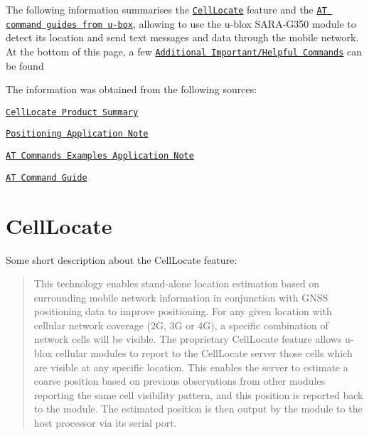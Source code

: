 The following information summarises the \href{#celllocate}{\tt {\ttfamily Cell\+Locate}} feature and the \href{#u-blox-command-guide}{\tt {\ttfamily AT command guides from u-\/box}}, allowing to use the u-\/blox S\+A\+R\+A-\/\+G350 module to detect its location and send text messages and data through the mobile network. At the bottom of this page, a few \href{#additional-importanthelpful-commands}{\tt {\ttfamily Additional Important/\+Helpful Commands}} can be found

The information was obtained from the following sources\+:
\begin{DoxyItemize}
\item \href{https://www.u-blox.com/sites/default/files/products/documents/CellLocate_ProductSummary_%28UBX-15011829%29.pdf}{\tt {\ttfamily Cell\+Locate Product Summary}}
\item \href{https://www.u-blox.com/sites/default/files/GNSS-Implementation_AppNote_%28UBX-13001849%29.pdf}{\tt {\ttfamily Positioning Application Note}}
\item \href{https://www.u-blox.com/sites/default/files/AT-CommandsExamples_AppNote_%28UBX-13001820%29.pdf}{\tt {\ttfamily AT Commands Examples Application Note}}
\item \href{https://www.u-blox.com/en/docs/UBX-13002752}{\tt {\ttfamily AT Command Guide}}
\end{DoxyItemize}

\section*{Cell\+Locate}

Some short description about the Cell\+Locate feature\+:

\begin{quote}
This technology enables stand-\/alone location estimation based on surrounding mobile network information in conjunction with G\+N\+SS positioning data to improve positioning. For any given location with cellular network coverage (2G, 3G or 4G), a specific combination of network cells will be visible. The proprietary Cell\+Locate feature allows u-\/blox cellular modules to report to the Cell\+Locate server those cells which are visible at any specific location. This enables the server to estimate a coarse position based on previous observations from other modules reporting the same cell visibility pattern, and this position is reported back to the module. The estimated position is then output by the module to the host processor via its serial port. \end{quote}


